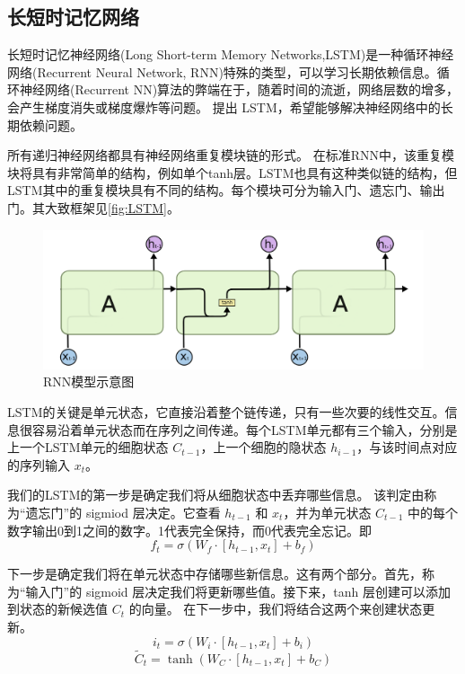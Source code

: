 \subsection{长短时记忆网络}
长短时记忆神经网络(Long Short-term Memory Networks,LSTM)是一种循环神经网络(Recurrent Neural Network, RNN)特殊的类型，可以学习长期依赖信息。循环神经网络(Recurrent NN)算法的弊端在于，随着时间的流逝，网络层数的增多，会产生梯度消失或梯度爆炸等问题。\cite{hochreiter1997long} 提出 LSTM，希望能够解决神经网络中的长期依赖问题。


所有递归神经网络都具有神经网络重复模块链的形式。 在标准RNN中，该重复模块将具有非常简单的结构，例如单个tanh层。LSTM也具有这种类似链的结构，但LSTM其中的重复模块具有不同的结构。每个模块可分为输入门、遗忘门、输出门。其大致框架见\ref{fig:LSTM}。
\begin{figure}[ht]
	\centering
	\includegraphics[width=\linewidth]{figures/RNN.png}
	\caption{RNN模型示意图}
    \label{fig:RNN}
\end{figure}

LSTM的关键是单元状态，它直接沿着整个链传递，只有一些次要的线性交互。信息很容易沿着单元状态而在序列之间传递。每个LSTM单元都有三个输入，分别是上一个LSTM单元的细胞状态 $C_{t-1}$，上一个细胞的隐状态 $h_{i-1}$，与该时间点对应的序列输入 $x_t$。

我们的LSTM的第一步是确定我们将从细胞状态中丢弃哪些信息。 该判定由称为“遗忘门”的 sigmiod 层决定。它查看 $h_{t-1}$ 和 $x_t$，并为单元状态 $C_{t-1}$ 中的每个数字输出0到1之间的数字。1代表完全保持，而0代表完全忘记。即
\begin{equation}
f_{t}=\sigma\left(W_{f} \cdot\left[h_{t-1}, x_{t}\right]+b_{f}\right)
\end{equation}

下一步是确定我们将在单元状态中存储哪些新信息。这有两个部分。首先，称为“输入门”的 sigmoid 层决定我们将更新哪些值。接下来，tanh 层创建可以添加到状态的新候选值 $C_t$ 的向量。 在下一步中，我们将结合这两个来创建状态更新。
\begin{equation}
i_{t}=\sigma\left(W_{i} \cdot\left[h_{t-1}, x_{t}\right]+b_{i}\right)
\end{equation}
\begin{equation}
\tilde{C}_{t}=\tanh \left(W_{C} \cdot\left[h_{t-1}, x_{t}\right]+b_{C}\right)
\end{equation}

